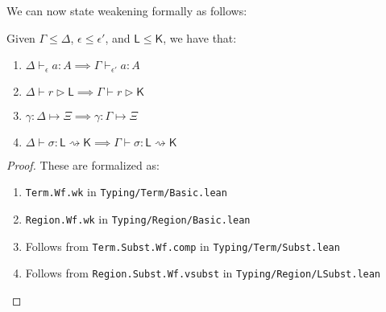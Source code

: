 \documentclass[acmsmall,screen,review]{acmart}
\newcommand{\ms}[1]{\ensuremath{\mathsf{#1}}}
\newcommand{\hasty}[4]{#1 \vdash_{#2} #3: {#4}}
\newcommand{\haslb}[3]{#1 \vdash #2 \rhd #3}
\newcommand{\issubst}[3]{#1: #2 \mapsto #3}
\newcommand{\lbsubst}[4]{#1 \vdash #2: #3 \rightsquigarrow #4}
\begin{document}
We can now state weakening formally as follows:
\begin{lemma}[Weakening]
  Given $\Gamma \leq \Delta$, $\epsilon \leq \epsilon'$, and $\ms{L} \leq \ms{K}$, we have that:
  \begin{enumerate}[label=(\alph*)]
    \item $\hasty{\Delta}{\epsilon}{a}{A} \implies \hasty{\Gamma}{\epsilon'}{a}{A}$
    \item $\haslb{\Delta}{r}{\ms{L}} \implies \haslb{\Gamma}{r}{\ms{K}}$
    \item $\issubst{\gamma}{\Delta}{\Xi} \implies \issubst{\gamma}{\Gamma}{\Xi}$
    \item $\lbsubst{\Delta}{\sigma}{\ms{L}}{\ms{K}} \implies \lbsubst{\Gamma}{\sigma}{\ms{L}}{\ms{K}}$
  \end{enumerate}
\end{lemma}
\begin{proof}
  These are formalized as:
  \begin{enumerate}[label=(\alph*)]
    \item \texttt{Term.Wf.wk} in \texttt{Typing/Term/Basic.lean}
    \item \texttt{Region.Wf.wk} in \texttt{Typing/Region/Basic.lean}
    \item Follows from \texttt{Term.Subst.Wf.comp} in \texttt{Typing/Term/Subst.lean}
    \item Follows from \texttt{Region.Subst.Wf.vsubst} in \texttt{Typing/Region/LSubst.lean}
  \end{enumerate}
\end{proof}
\end{document}
